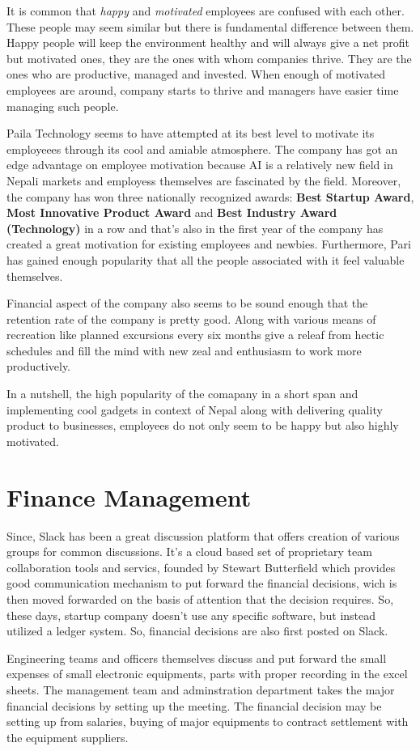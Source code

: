 \documentclass[12pt,a4paper]{scrreprt}
\begin{document}
It is common that \textit{happy} and \textit{motivated} employees are confused with each other. These people may seem similar but there is fundamental difference between them. Happy people will keep the environment healthy and will always give a net profit but motivated ones, they are the ones with whom companies thrive. They are the ones who are productive, managed and invested. When enough of motivated employees are around, company starts to thrive and managers have easier time managing such people. 

Paila Technology seems to have attempted at its best level to motivate its employeees through its cool and amiable atmosphere. The company has got an edge advantage on employee motivation because AI is a relatively new field in Nepali markets and employess themselves are fascinated by the field. Moreover, the company has won three nationally recognized awards: \textbf{Best Startup Award}, \textbf{Most Innovative Product Award} and \textbf{Best Industry Award (Technology)} in a row and that's also in the first year of the company has created a great motivation for existing employees and newbies. Furthermore, Pari has gained enough popularity that all the people associated with it feel valuable themselves.

Financial aspect of the company also seems to be sound enough that the retention rate of the company is pretty good. Along with various means of recreation like planned excursions every six months give a releaf from hectic schedules and fill the mind with new zeal and enthusiasm to work more productively.
 
In a nutshell, the high popularity of the comapany in a short span and implementing cool gadgets in context of Nepal along with delivering quality product to businesses, employees do not only seem to be happy but also highly motivated.

\chapter{Finance Management}
Since, Slack has been a great discussion platform that offers creation of various groups for common discussions. It's a cloud based set of proprietary team collaboration tools and servics, founded by Stewart Butterfield which provides good communication mechanism to put forward the financial decisions, wich is then moved forwarded on the basis of attention that the decision requires. So, these days, startup company doesn't use any specific software, but instead utilized a ledger system. So, financial decisions are also first posted on Slack.\par
Engineering teams and officers themselves discuss and put forward the small expenses of small electronic equipments, parts with proper recording in the excel sheets. The management team and adminstration department takes the major financial decisions by setting up the meeting. The financial decision may be setting up from salaries, buying of major equipments to contract settlement with the equipment suppliers.
\end{document}
